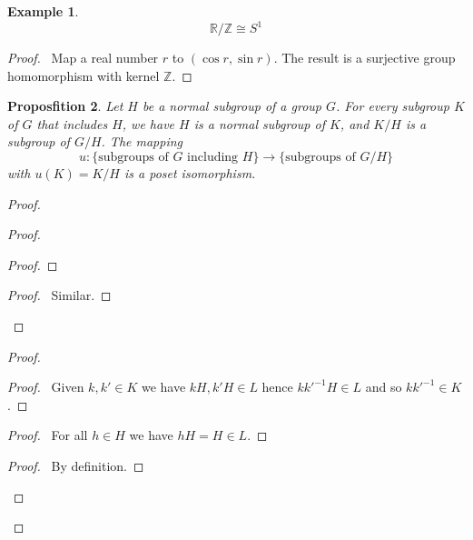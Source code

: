 \documentclass{book}
\let\qed\relax
\newtheorem{prop}{Proposfition}[chapter]
\theoremstyle{definition}
\newtheorem{ex}[prop]{Example}
\newcommand{\inv}[1]{\ensuremath{{#1}^{-1}}}
\begin{document}
\begin{ex}
\[ \mathbb{R} / \mathbb{Z} \cong S^1 \]
\end{ex}

\begin{proof}
\pf\ Map a real number $r$ to $(\cos r, \sin r)$. The result is a surjective group homomorphism with kernel $\mathbb{Z}$. \qed
\end{proof}

\begin{prop}
Let $H$ be a normal subgroup of a group $G$. For every subgroup $K$ of $G$ that includes $H$, we have $H$ is a normal subgroup of $K$, and $K/H$ is a subgroup of $G/H$. The mapping
\[ u : \{ \text{subgroups of } G \text{ including } H \} \rightarrow \{ \text{subgroups of } G / H \} \]
with $u(K) = K/H$ is a poset isomorphism.
\end{prop}

\begin{proof}
\pf
{}
\begin{proof}
	\begin{proof}
		\step{iv}{$k\inv{k'} \in H$}
		\step{v}{$k \inv{k'} \in K_2$}
	\end{proof}
	\begin{proof}
		\pf\ Similar.
	\end{proof}
\end{proof}
\begin{proof}
	\begin{proof}
		\pf\ Given $k,k' \in K$ we have $kH,k'H \in L$ hence $k\inv{k'}H \in L$ and so $k\inv{k'} \in K$.
	\end{proof}
	\begin{proof}
		\pf\ For all $h \in H$ we have $hH = H \in L$.
	\end{proof}
	\begin{proof}
		\pf\ By definition.
	\end{proof}
\end{proof}
\qed
\end{proof}
\end{document}
